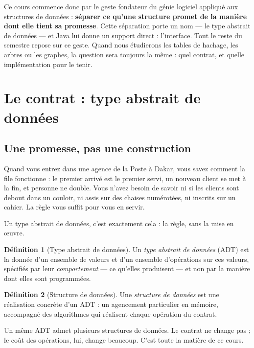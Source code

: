 \documentclass[11pt,a4paper]{article}
\theoremstyle{definition}
\newtheorem{definition}{Définition}[section]
\theoremstyle{remark}
\begin{document}
Ce cours commence donc par le geste fondateur du génie logiciel appliqué aux
structures de données : \textbf{séparer ce qu'une structure promet de la
manière dont elle tient sa promesse}. Cette séparation porte un nom --- le
type abstrait de données --- et Java lui donne un support direct : l'interface.
Tout le reste du semestre repose sur ce geste. Quand nous étudierons les
tables de hachage, les arbres ou les graphes, la question sera toujours la
même : quel contrat, et quelle implémentation pour le tenir.

\section{Le contrat : type abstrait de données}

\subsection{Une promesse, pas une construction}

Quand vous entrez dans une agence de la Poste à Dakar, vous savez comment la
file fonctionne : le premier arrivé est le premier servi, un nouveau client se
met à la fin, et personne ne double. Vous n'avez besoin de savoir ni si les
clients sont debout dans un couloir, ni assis sur des chaises numérotées, ni
inscrits sur un cahier. La règle vous suffit pour vous en servir.

Un type abstrait de données, c'est exactement cela : la règle, sans la mise en
œuvre.

\begin{definition}[Type abstrait de données]
Un \emph{type abstrait de données} (ADT) est la donnée d'un ensemble de
valeurs et d'un ensemble d'opérations sur ces valeurs, spécifiés par leur
\emph{comportement} --- ce qu'elles produisent --- et non par la manière dont
elles sont programmées.
\end{definition}

\begin{definition}[Structure de données]
Une \emph{structure de données} est une réalisation concrète d'un ADT : un
agencement particulier en mémoire, accompagné des algorithmes qui réalisent
chaque opération du contrat.
\end{definition}

Un même ADT admet plusieurs structures de données. Le contrat ne change pas ;
le coût des opérations, lui, change beaucoup. C'est toute la matière de ce
cours.
\end{document}
